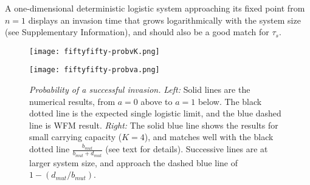 A one-dimensional deterministic logistic system approaching its fixed point from $n=1$ displays an invasion time that grows logarithmically with the system size (see Supplementary Information), and should also be a good match for $\tau_{s}$. 

\begin{figure}[h]
	\centering
	\begin{minipage}{0.49\linewidth}
		\centering
		\texttt{[image: fiftyfifty-probvK.png]}
	\end{minipage}
	\begin{minipage}{0.49\linewidth}
		\centering
		\texttt{[image: fiftyfifty-probva.png]}
	\end{minipage}
	\caption{\emph{Probability of a successful invasion.}
		\emph{Left:} Solid lines are the numerical results, from $a=0$ above to $a=1$ below. The black dotted line is the expected single logistic limit, and the blue dashed line is WFM result. 
		\emph{Right:} The solid blue line shows the results for small carrying capacity ($K=4$), and matches well with the black dotted line $\frac{b_{mut}}{b_{mut}+d_{mut}}$ (see text for details). Successive lines are at larger system size, and approach the dashed blue line of $1-(d_{mut}/b_{mut})$. 
	} \label{Esucc}
\end{figure}

